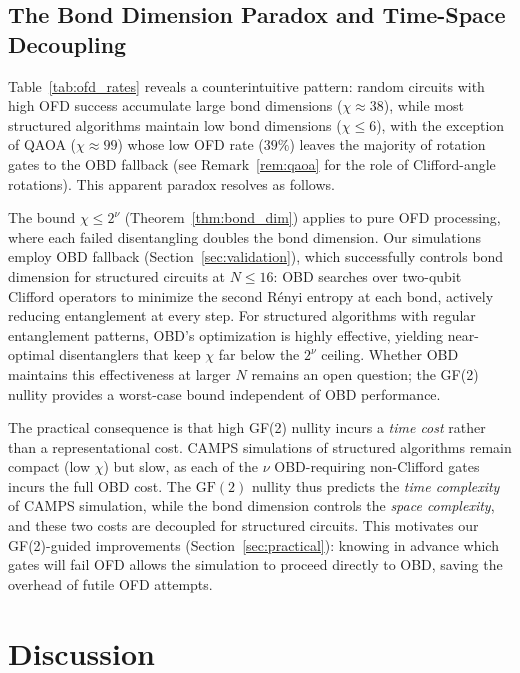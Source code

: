 \documentclass[a4paper,twocolumn,11pt]{quantumarticle}
\begin{document}
\subsection{The Bond Dimension Paradox and Time-Space Decoupling}

Table~\ref{tab:ofd_rates} reveals a counterintuitive pattern: random circuits with high OFD success accumulate large bond dimensions ($\chi \approx 38$), while most structured algorithms maintain low bond dimensions ($\chi \le 6$), with the exception of QAOA ($\chi \approx 99$) whose low OFD rate ($39\%$) leaves the majority of rotation gates to the OBD fallback (see Remark~\ref{rem:qaoa} for the role of Clifford-angle rotations).
This apparent paradox resolves as follows.

The bound $\chi \le 2^\nu$ (Theorem~\ref{thm:bond_dim}) applies to pure OFD processing, where each failed disentangling doubles the bond dimension.
Our simulations employ OBD fallback (Section~\ref{sec:validation}), which successfully controls bond dimension for structured circuits at $N \le 16$: OBD searches over two-qubit Clifford operators to minimize the second R\'enyi entropy at each bond, actively reducing entanglement at every step.
For structured algorithms with regular entanglement patterns, OBD's optimization is highly effective, yielding near-optimal disentanglers that keep $\chi$ far below the $2^\nu$ ceiling.
Whether OBD maintains this effectiveness at larger $N$ remains an open question; the GF(2) nullity provides a worst-case bound independent of OBD performance.

The practical consequence is that high GF(2) nullity incurs a \emph{time cost} rather than a representational cost.
CAMPS simulations of structured algorithms remain compact (low $\chi$) but slow, as each of the $\nu$ OBD-requiring non-Clifford gates incurs the full OBD cost.
The $\mathrm{GF}(2)$ nullity thus predicts the \emph{time complexity} of CAMPS simulation, while the bond dimension controls the \emph{space complexity}, and these two costs are decoupled for structured circuits.
This motivates our GF(2)-guided improvements (Section~\ref{sec:practical}): knowing in advance which gates will fail OFD allows the simulation to proceed directly to OBD, saving the overhead of futile OFD attempts.


\section{Discussion}
\label{sec:discussion}
\end{document}
